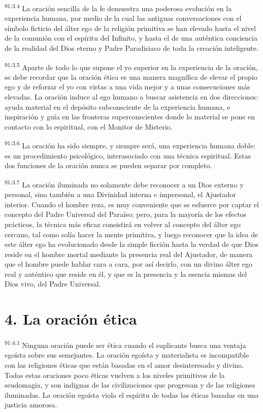 \documentclass[twoside, 11pt]{book}
\begin{document}
\par
\textsuperscript{91:3.4} La oración sencilla de la fe demuestra una poderosa evolución en la experiencia humana, por medio de la cual las antiguas conversaciones con el símbolo ficticio del álter ego de la religión primitiva se han elevado hasta el nivel de la comunión con el espíritu del Infinito, y hasta el de una auténtica conciencia de la realidad del Dios eterno y Padre Paradisiaco de toda la creación inteligente.

\par
\textsuperscript{91:3.5} Aparte de todo lo que supone el yo superior en la experiencia de la oración, se debe recordar que la oración ética es una manera magnífica de elevar el propio ego y de reforzar el yo con vistas a una vida mejor y a unas consecuciones más elevadas. La oración induce al ego humano a buscar asistencia en dos direcciones: ayuda material en el depósito subconsciente de la experiencia humana, e inspiración y guía en las fronteras superconscientes donde lo material se pone en contacto con lo espiritual, con el Monitor de Misterio.

\par
\textsuperscript{91:3.6} La oración ha sido siempre, y siempre será, una experiencia humana doble: es un procedimiento psicológico, interasociado con una técnica espiritual. Estas dos funciones de la oración nunca se pueden separar por completo.

\par
\textsuperscript{91:3.7} La oración iluminada no solamente debe reconocer a un Dios externo y personal, sino también a una Divinidad interna e impersonal, el Ajustador interior. Cuando el hombre reza, es muy conveniente que se esfuerce por captar el concepto del Padre Universal del Paraíso; pero, para la mayoría de los efectos prácticos, la técnica más eficaz consistirá en volver al concepto del álter ego cercano, tal como solía hacer la mente primitiva, y luego reconocer que la idea de este álter ego ha evolucionado desde la simple ficción hasta la verdad de que Dios reside en el hombre mortal mediante la presencia real del Ajustador, de manera que el hombre puede hablar cara a cara, por así decirlo, con un divino álter ego real y auténtico que reside en él, y que es la presencia y la esencia mismas del Dios vivo, del Padre Universal.

\section*{4. La oración ética}
\par
\textsuperscript{91:4.1} Ninguna oración puede ser ética cuando el suplicante busca una ventaja egoísta sobre sus semejantes. La oración egoísta y materialista es incompatible con las religiones éticas que están basadas en el amor desinteresado y divino. Todas estas oraciones poco éticas vuelven a los niveles primitivos de la seudomagia, y son indignas de las civilizaciones que progresan y de las religiones iluminadas. La oración egoísta viola el espíritu de todas las éticas basadas en una justicia amorosa.
\end{document}
